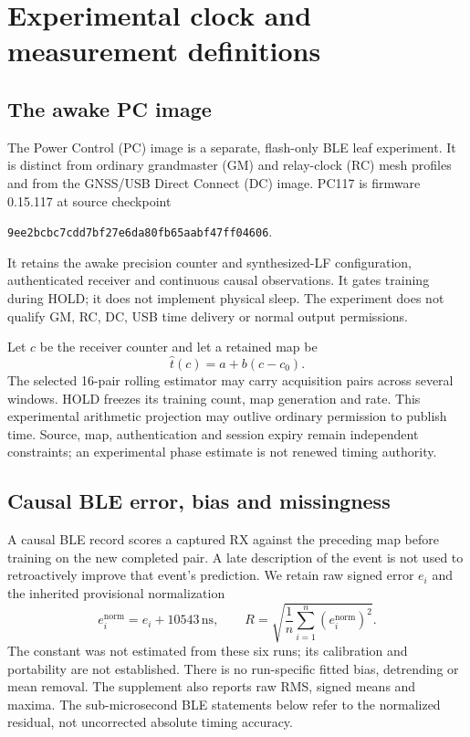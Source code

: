 \documentclass[11pt,letterpaper]{article}
\newcommand{\ns}{\,\mathrm{ns}}\newcommand{\us}{\,\mu\mathrm{s}}\newcommand{\ms}{\,\mathrm{ms}}\newcommand{\ppm}{\,\mathrm{ppm}}
\newcommand{\code}[1]{\texttt{#1}}
\begin{document}
\section{Experimental clock and measurement definitions}\label{sec:definitions}
\subsection{The awake PC image}
The Power Control (PC) image is a separate, flash-only BLE leaf experiment. It is distinct from ordinary grandmaster (GM) and relay-clock (RC) mesh profiles and from the GNSS/USB Direct Connect (DC) image. PC117 is firmware 0.15.117 at source checkpoint
\begin{center}\small\code{9ee2bcbc7cdd7bf27e6da80fb65aabf47ff04606}.\end{center}
It retains the awake precision counter and synthesized-LF configuration, authenticated receiver and continuous causal observations. It gates training during HOLD; it does not implement physical sleep. The experiment does not qualify GM, RC, DC, USB time delivery or normal output permissions.

Let $c$ be the receiver counter and let a retained map be
\begin{equation}
 \widehat{t}(c)=a+b(c-c_0).\label{eq:map}
\end{equation}
The selected 16-pair rolling estimator may carry acquisition pairs across several windows. HOLD freezes its training count, map generation and rate. This experimental arithmetic projection may outlive ordinary permission to publish time. Source, map, authentication and session expiry remain independent constraints; an experimental phase estimate is not renewed timing authority.

\subsection{Causal BLE error, bias and missingness}
A causal BLE record scores a captured RX against the preceding map before training on the new completed pair. A late description of the event is not used to retroactively improve that event's prediction. We retain raw signed error $e_i$ and the inherited provisional normalization
\begin{equation}
 e_i^{\mathrm{norm}}=e_i+10543\ns,\qquad
 R=\sqrt{\frac{1}{n}\sum_{i=1}^{n}(e_i^{\mathrm{norm}})^2}.\label{eq:rms}
\end{equation}
The constant was not estimated from these six runs; its calibration and portability are not established. There is no run-specific fitted bias, detrending or mean removal. The supplement also reports raw RMS, signed means and maxima. The sub-microsecond BLE statements below refer to the normalized residual, not uncorrected absolute timing accuracy.
\end{document}
